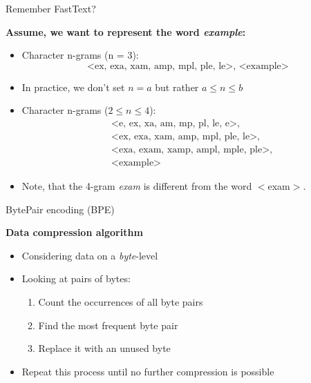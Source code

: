 \documentclass[11pt,compress,t,notes=noshow, xcolor=table]{beamer}
\begin{document}

\begin{vbframe}{Remember FastText?}

\vfill

\textbf{Assume, we want to represent the word \textit{example}:}

\begin{itemize}
	\item Character n-grams (n = 3):  
		$$\text{<ex, exa, xam, amp, mpl, ple, le>, <example>}$$
	\item In practice, we don't set $n = a$ but rather $a \leq n \leq b$
	\item Character n-grams ($2 \leq n \leq 4$):
  \begin{align*}
    & \text{<e, ex, xa, am, mp, pl, le, e>,} \\
    & \text{<ex, exa, xam, amp, mpl, ple, le>,} \\
    & \text{<exa, exam, xamp, ampl, mple, ple>,} \\
		& \text{<example>}
  \end{align*}
	\item Note, that the 4-gram \textit{exam} is different from the word $<$exam$>$.
\end{itemize}

\vfill

\end{vbframe}


\begin{vbframe}{BytePair encoding (BPE)}

\vfill

\textbf{Data compression algorithm \href{https://www.derczynski.com/papers/archive/BPE_Gage.pdf}{}}

	\begin{itemize}
		\item Considering data on a \textit{byte}-level
		\item Looking at pairs of bytes:
			\begin{enumerate}
				\item Count the occurrences of all byte pairs
				\item Find the most frequent byte pair
				\item Replace it with an unused byte
			\end{enumerate}
		\item Repeat this process until no further compression is possible
	\end{itemize}

\vfill

\end{vbframe}
\end{document}
